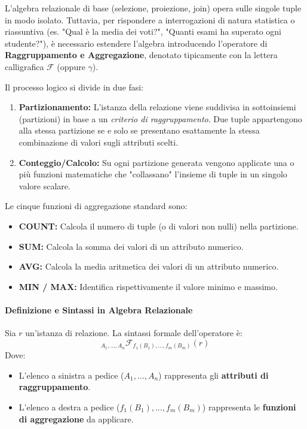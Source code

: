 L'algebra relazionale di base (selezione, proiezione, join) opera sulle singole tuple in modo isolato. Tuttavia, per rispondere a interrogazioni di natura statistica o riassuntiva (es. "Qual è la media dei voti?", "Quanti esami ha superato ogni studente?"), è necessario estendere l'algebra introducendo l'operatore di \textbf{Raggruppamento e Aggregazione}, denotato tipicamente con la lettera calligrafica $\mathcal{F}$ (oppure $\gamma$).

Il processo logico si divide in due fasi:
\begin{enumerate}
    \item \textbf{Partizionamento:} L'istanza della relazione viene suddivisa in sottoinsiemi (partizioni) in base a un \textit{criterio di raggruppamento}. Due tuple appartengono alla stessa partizione se e solo se presentano esattamente la stessa combinazione di valori sugli attributi scelti.
    \item \textbf{Conteggio/Calcolo:} Su ogni partizione generata vengono applicate una o più funzioni matematiche che "collassano" l'insieme di tuple in un singolo valore scalare.
\end{enumerate}

Le cinque funzioni di aggregazione standard sono:
\begin{itemize}
    \item \textbf{COUNT:} Calcola il numero di tuple (o di valori non nulli) nella partizione.
    \item \textbf{SUM:} Calcola la somma dei valori di un attributo numerico.
    \item \textbf{AVG:} Calcola la media aritmetica dei valori di un attributo numerico.
    \item \textbf{MIN / MAX:} Identifica rispettivamente il valore minimo e massimo.
\end{itemize}

\paragraph{Definizione e Sintassi in Algebra Relazionale}

Sia $r$ un'istanza di relazione. La sintassi formale dell'operatore è:
$$ {}_{A_1, \dots, A_n} \mathcal{F}_{f_1(B_1), \dots, f_m(B_m)}(r) $$
Dove:
\begin{itemize}
    \item L'elenco a sinistra a pedice ($A_1, \dots, A_n$) rappresenta gli \textbf{attributi di raggruppamento}.
    \item L'elenco a destra a pedice ($f_1(B_1), \dots, f_m(B_m)$) rappresenta le \textbf{funzioni di aggregazione} da applicare.
\end{itemize}

